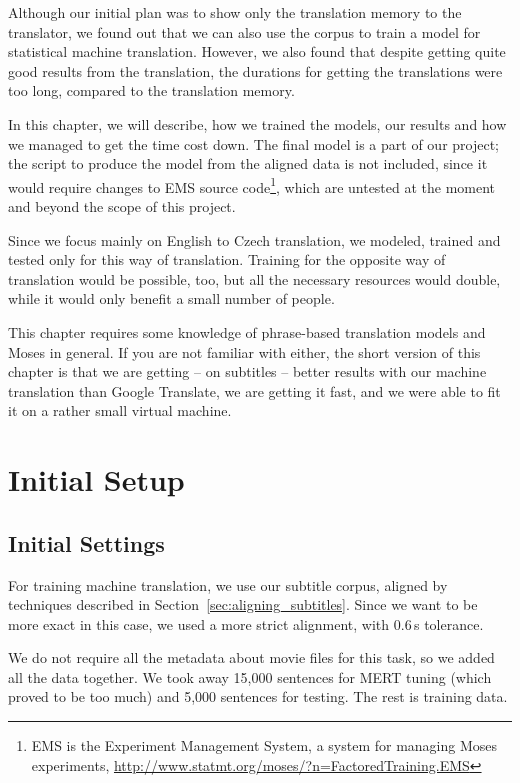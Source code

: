 \label{chap:moses}

Although our initial plan was to show only the translation memory to the translator, we found out that we can also use the corpus to train a model for statistical machine translation. However, we also found that despite getting quite good results from the translation, the durations for getting the translations were too long, compared to the translation memory.

In this chapter, we will describe, how we trained the models, our results and how we managed to get the time cost down. The final model is a part of our project; the script to produce the model from the aligned data is not included, since it would require changes to EMS source code\footnote{EMS is the Experiment Management System, a system for managing Moses experiments, \url{http://www.statmt.org/moses/?n=FactoredTraining.EMS}}, which are untested at the moment and beyond the scope of this project.

Since we focus mainly on English to Czech translation, we modeled, trained and tested only for this way of translation. Training for the opposite way of translation would be possible, too, but all the necessary resources would double, while it would only benefit a small number of people.

This chapter requires some knowledge of phrase-based translation models and Moses in general. If you are not familiar with either, the short version of this chapter is that we are getting -- on subtitles -- better results with our machine translation than Google Translate, we are getting it fast, and we were able to fit it on a rather small virtual machine.


\section{Initial Setup}
\subsection{Initial Settings}

For training machine translation, we use our subtitle corpus, aligned by techniques described in Section~\ref{sec:aligning_subtitles}. Since we want to be more exact in this case, we used a more strict alignment, with 0.6\,s tolerance.

We do not require all the metadata about movie files for this task, so we added all the data together. We took away 15,000 sentences for MERT tuning (which proved to be too much) and 5,000 sentences for testing. The rest is training data.

